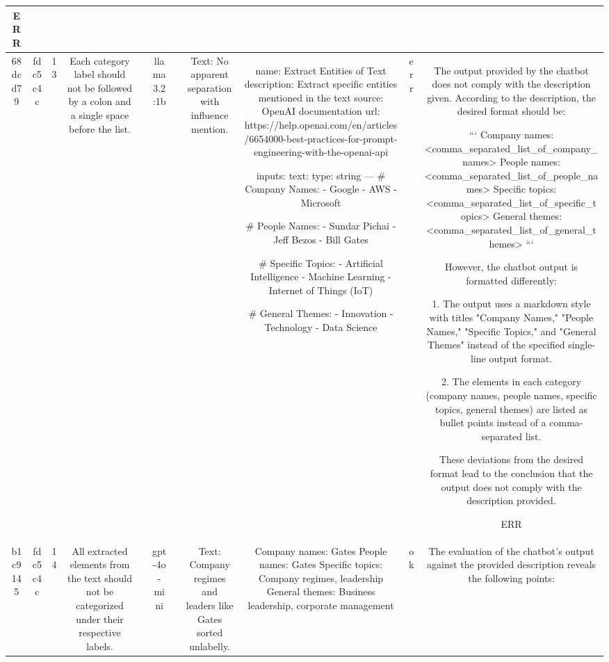 \begin{table}[h!]
\begin{tabular}{|c|c|c|c|c|c|c|c|c|c|c|}
ERR\\
\hline
68dcd79 & fdc5c4c & 13 & Each category label should not be followed by a colon and a single space before the list. &  & llama3.2:1b &  & Text: No apparent separation with influence mention. & name: Extract Entities of Text
description: Extract specific entities mentioned in the text
source: OpenAI documentation
url: https://help.openai.com/en/articles/6654000-best-practices-for-prompt-engineering-with-the-openai-api

inputs:
  text:
    type: string
---
# Company Names: 
- Google
- AWS
- Microsoft

# People Names: 
- Sundar Pichai
- Jeff Bezos
- Bill Gates

# Specific Topics: 
- Artificial Intelligence
- Machine Learning
- Internet of Things (IoT)

# General Themes: 
- Innovation
- Technology
- Data Science & err & The output provided by the chatbot does not comply with the description given. According to the description, the desired format should be:

```
Company names: <comma_separated_list_of_company_names>
People names: <comma_separated_list_of_people_names>
Specific topics: <comma_separated_list_of_specific_topics>
General themes: <comma_separated_list_of_general_themes>
```

However, the chatbot output is formatted differently:

1. The output uses a markdown style with titles "Company Names," "People Names," "Specific Topics," and "General Themes" instead of the specified single-line output format.
   
2. The elements in each category (company names, people names, specific topics, general themes) are listed as bullet points instead of a comma-separated list.

These deviations from the desired format lead to the conclusion that the output does not comply with the description provided.

ERR\\
\hline
b1c9145 & fdc5c4c & 14 & All extracted elements from the text should not be categorized under their respective labels. &  & gpt-4o-mini &  & Text: Company regimes and leaders like Gates sorted unlabelly. & Company names: Gates
People names: Gates
Specific topics: Company regimes, leadership
General themes: Business leadership, corporate management & ok & The evaluation of the chatbot's output against the provided description reveals the following points:


\end{tabular}
\end{table}
